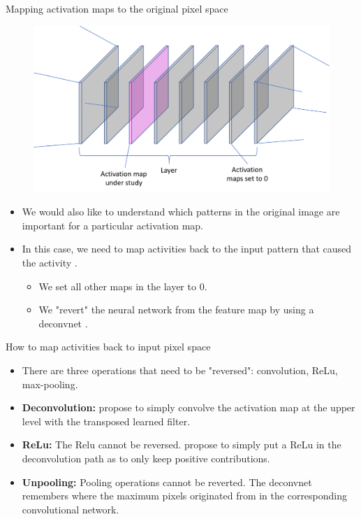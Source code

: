 \documentclass[xcolor=pdftex,dvipsnames,table]{beamer}
\begin{document}
\begin{frame}{Mapping activation maps to the original pixel space}
\begin{figure}[htb]
  \centering
  \includegraphics[width=.7\textwidth]{../graphics/Vis_activationmaps_zero.pdf}
\end{figure}
\begin{itemize}
	\item We would also like to understand which patterns in the original image are important for a particular activation map.
	\item In this case, we need to map activities back to the input pattern that caused the activity \cite{Zeiler:2013}. 
	\begin{itemize}
		\item We set all other maps in the layer to 0. 
		\item We "revert" the neural network from the feature map by using a deconvnet \cite{Zeiler:2011}.
	\end{itemize}
\end{itemize}
\end{frame}

\begin{frame}{How to map activities back to input pixel space}
\begin{itemize}
	\item There are three operations that need to be "reversed": convolution, ReLu, max-pooling. 
	\item {\bf Deconvolution:} \cite{Zeiler:2013} propose to simply convolve the activation map at the upper level with the transposed learned filter. 
	\item {\bf ReLu:} The Relu cannot be reversed. \cite{Zeiler:2013}  propose to simply put a ReLu in the deconvolution path as to only keep positive contributions. 
	\item {\bf Unpooling:} Pooling operations cannot be reverted. The deconvnet remembers where the maximum pixels originated from in the corresponding convolutional network. 
\end{itemize}
\end{frame}
\end{document}
